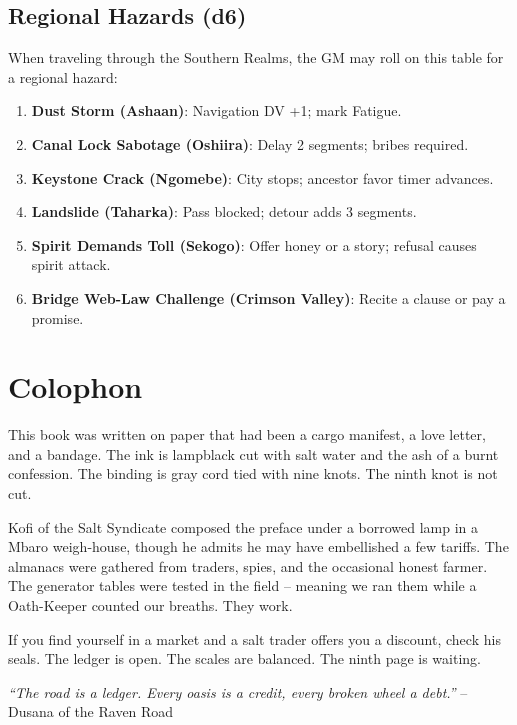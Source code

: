 \documentclass[12pt,oneside]{book}
\begin{document}
\section*{Regional Hazards (d6)}
When traveling through the Southern Realms, the GM may roll on this table for a regional hazard:
\begin{enumerate}
  \item \textbf{Dust Storm (Ashaan)}: Navigation DV +1; mark Fatigue.
  \item \textbf{Canal Lock Sabotage (Oshiira)}: Delay 2 segments; bribes required.
  \item \textbf{Keystone Crack (Ngomebe)}: City stops; ancestor favor timer advances.
  \item \textbf{Landslide (Taharka)}: Pass blocked; detour adds 3 segments.
  \item \textbf{Spirit Demands Toll (Sekogo)}: Offer honey or a story; refusal causes spirit attack.
  \item \textbf{Bridge Web-Law Challenge (Crimson Valley)}: Recite a clause or pay a promise.
\end{enumerate}

\chapter*{Colophon}

This book was written on paper that had been a cargo manifest, a love letter, and a bandage. The ink is lampblack cut with salt water and the ash of a burnt confession. The binding is gray cord tied with nine knots. The ninth knot is not cut.

Kofi of the Salt Syndicate composed the preface under a borrowed lamp in a Mbaro weigh-house, though he admits he may have embellished a few tariffs. The almanacs were gathered from traders, spies, and the occasional honest farmer. The generator tables were tested in the field -- meaning we ran them while a Oath-Keeper counted our breaths. They work.

If you find yourself in a market and a salt trader offers you a discount, check his seals. The ledger is open. The scales are balanced. The ninth page is waiting.

\vspace{1em}
\noindent\textit{``The road is a ledger. Every oasis is a credit, every broken wheel a debt.''} -- Dusana of the Raven Road
\end{document}
